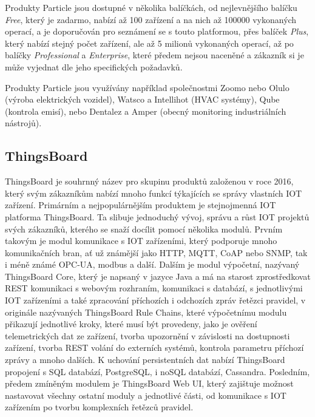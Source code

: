 Produkty Particle jsou dostupné v několika balíčkách, od nejlevnějšího balíčku \emph{Free}, který je zadarmo, nabízí až 100 zařízení a na nich až 100000 vykonaných operací, a je doporučován pro seznámení se s touto platformou, přes balíček \emph{Plus}, který nabízí stejný počet zařízení, ale až 5 milionů vykonaných operací, až po balíčky \emph{Professional} a \emph{Enterprise}, které předem nejsou naceněné a zákazník si je může vyjednat dle jeho specifických požadavků.  

Produkty Particle jsou využívány například společnostmi Zoomo nebo Olulo (výroba elektrických vozidel), Watsco a Intellihot (HVAC systémy), Qube (kontrola emisí), nebo Dentalez a Amper (obecný monitoring industriálních nástrojů).

\subsection{ThingsBoard}

ThingsBoard je souhrnný název pro skupinu produktů založenou v roce 2016, který svým zákazníkům nabízí mnoho funkcí týkajících se správy vlastních IOT zařízení. Primárním a nejpopulárnějším produktem je stejnojmenná IOT platforma ThingsBoard. Ta slibuje jednoduchý vývoj, správu a růst IOT projektů svých zákazníků, kterého se snaží docílit pomocí několika modulů. Prvním takovým je modul komunikace s IOT zařízeními, který podporuje mnoho komunikačních bran, ať už známější jako HTTP, MQTT, CoAP nebo SNMP, tak i méně známé OPC-UA, modbus a další. Dalším je modul výpočetní, nazývaný ThingsBoard Core, který je napsaný v jazyce Java a má na starost zprostředkovat REST komunikaci s webovým rozhraním, komunikaci s databází, s jednotlivými IOT zařízeními a také zpracování příchozích i odchozích zpráv řetězci pravidel, v originále nazývaných ThingsBoard Rule Chains, které výpočetnímu modulu přikazují jednotlivé kroky, které musí být provedeny, jako je ověření telemetrických dat ze zařízení, tvorba upozornění v závislosti na dostupnosti zařízení, tvorba REST volání do externích systémů, kontrola parametru příchozí zprávy a mnoho dalších. K uchování persistentních dat nabízí ThingsBoard propojení s SQL databází, PostgreSQL, i noSQL databází, Cassandra. Posledním, předem zmíněným modulem je ThingsBoard Web UI, který zajištuje možnost nastavovat všechny ostatní moduly a jednotlivé části, od komunikace s IOT zařízením po tvorbu komplexních řetězců pravidel.

